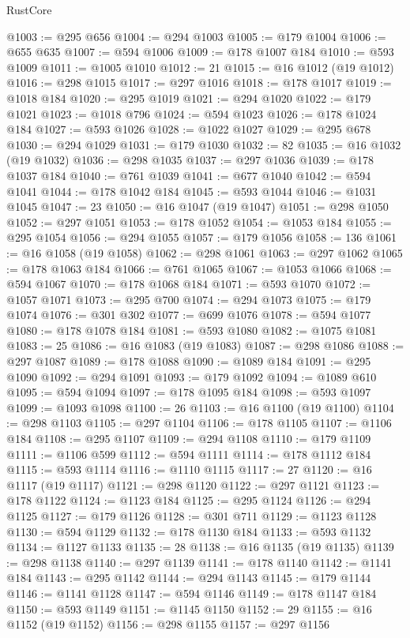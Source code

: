 \begin{lexlean}{RustCore}
\begin{coremodule}
@1003 := @295 @656
@1004 := @294 @1003
@1005 := @179 @1004
@1006 := @655 @635
@1007 := @594 @1006
@1009 := @178 @1007 @184
@1010 := @593 @1009
@1011 := @1005 @1010
@1012 := 21
@1015 := @16 @1012 (@19 @1012)
@1016 := @298 @1015
@1017 := @297 @1016
@1018 := @178 @1017
@1019 := @1018 @184
@1020 := @295 @1019
@1021 := @294 @1020
@1022 := @179 @1021
@1023 := @1018 @796
@1024 := @594 @1023
@1026 := @178 @1024 @184
@1027 := @593 @1026
@1028 := @1022 @1027
@1029 := @295 @678
@1030 := @294 @1029
@1031 := @179 @1030
@1032 := 82
@1035 := @16 @1032 (@19 @1032)
@1036 := @298 @1035
@1037 := @297 @1036
@1039 := @178 @1037 @184
@1040 := @761 @1039
@1041 := @677 @1040
@1042 := @594 @1041
@1044 := @178 @1042 @184
@1045 := @593 @1044
@1046 := @1031 @1045
@1047 := 23
@1050 := @16 @1047 (@19 @1047)
@1051 := @298 @1050
@1052 := @297 @1051
@1053 := @178 @1052
@1054 := @1053 @184
@1055 := @295 @1054
@1056 := @294 @1055
@1057 := @179 @1056
@1058 := 136
@1061 := @16 @1058 (@19 @1058)
@1062 := @298 @1061
@1063 := @297 @1062
@1065 := @178 @1063 @184
@1066 := @761 @1065
@1067 := @1053 @1066
@1068 := @594 @1067
@1070 := @178 @1068 @184
@1071 := @593 @1070
@1072 := @1057 @1071
@1073 := @295 @700
@1074 := @294 @1073
@1075 := @179 @1074
@1076 := @301 @302
@1077 := @699 @1076
@1078 := @594 @1077
@1080 := @178 @1078 @184
@1081 := @593 @1080
@1082 := @1075 @1081
@1083 := 25
@1086 := @16 @1083 (@19 @1083)
@1087 := @298 @1086
@1088 := @297 @1087
@1089 := @178 @1088
@1090 := @1089 @184
@1091 := @295 @1090
@1092 := @294 @1091
@1093 := @179 @1092
@1094 := @1089 @610
@1095 := @594 @1094
@1097 := @178 @1095 @184
@1098 := @593 @1097
@1099 := @1093 @1098
@1100 := 26
@1103 := @16 @1100 (@19 @1100)
@1104 := @298 @1103
@1105 := @297 @1104
@1106 := @178 @1105
@1107 := @1106 @184
@1108 := @295 @1107
@1109 := @294 @1108
@1110 := @179 @1109
@1111 := @1106 @599
@1112 := @594 @1111
@1114 := @178 @1112 @184
@1115 := @593 @1114
@1116 := @1110 @1115
@1117 := 27
@1120 := @16 @1117 (@19 @1117)
@1121 := @298 @1120
@1122 := @297 @1121
@1123 := @178 @1122
@1124 := @1123 @184
@1125 := @295 @1124
@1126 := @294 @1125
@1127 := @179 @1126
@1128 := @301 @711
@1129 := @1123 @1128
@1130 := @594 @1129
@1132 := @178 @1130 @184
@1133 := @593 @1132
@1134 := @1127 @1133
@1135 := 28
@1138 := @16 @1135 (@19 @1135)
@1139 := @298 @1138
@1140 := @297 @1139
@1141 := @178 @1140
@1142 := @1141 @184
@1143 := @295 @1142
@1144 := @294 @1143
@1145 := @179 @1144
@1146 := @1141 @1128
@1147 := @594 @1146
@1149 := @178 @1147 @184
@1150 := @593 @1149
@1151 := @1145 @1150
@1152 := 29
@1155 := @16 @1152 (@19 @1152)
@1156 := @298 @1155
@1157 := @297 @1156

\end{coremodule}
\end{lexlean}
